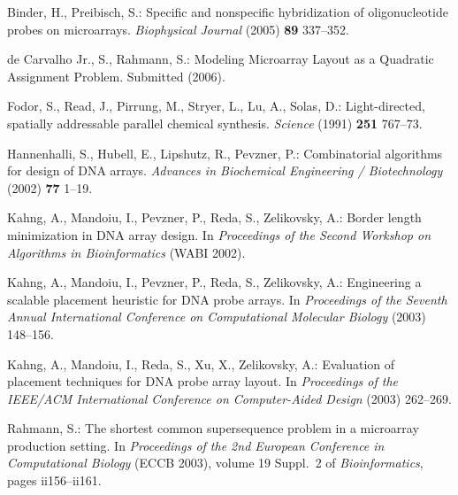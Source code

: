 \documentclass[runningheads]{llncs}
\newcommand{\ignore}[1]{}
\begin{document}
\begin{thebibliography}{5}

Binder, H., Preibisch, S.:
Specific and nonspecific hybridization of oligonucleotide probes on microarrays.
{\it Biophysical Journal} (2005) {\bf 89} 337--352.

de Carvalho Jr., S., Rahmann, S.:
Modeling Microarray Layout as a Quadratic Assignment Problem.
Submitted (2006).

\ignore{
\bibitem{CHASE76}
Chase, P.:
Subsequence numbers and logarithmic concavity.
{\it Discrete Mathematics} (1976) {\bf 16} 123--140.

\bibitem{FELDMAN93}
Feldman, W., Pevzner, P.:
Gray code masks for sequencing by hibridization.
{\it Genomics} (1994) {\bf 23} 233--235.
}

Fodor, S., Read, J., Pirrung, M., Stryer, L., Lu, A., Solas, D.:
Light-directed, spatially addressable parallel chemical synthesis.
{\it Science} (1991) {\bf 251} 767--73.

Hannenhalli, S., Hubell, E., Lipshutz, R., Pevzner, P.:
Combinatorial algorithms for design of DNA arrays.
{\it Advances in Biochemical Engineering / Biotechnology} (2002) {\bf 77} 1--19.

Kahng, A., Mandoiu, I., Pevzner, P., Reda, S., Zelikovsky, A.:
Border length minimization in DNA array design.
In {\it Proceedings of the Second Workshop on Algorithms in Bioinformatics} (WABI 2002).

Kahng, A., Mandoiu, I., Pevzner, P., Reda, S., Zelikovsky, A.:
Engineering a scalable placement heuristic for DNA probe arrays.
In {\it Proceedings of the Seventh Annual International Conference on Computational
Molecular Biology} (2003) 148--156.

Kahng, A., Mandoiu, I., Reda, S., Xu, X., Zelikovsky, A.:
Evaluation of placement techniques for DNA probe array layout.
In {\it Proceedings of the IEEE/ACM International Conference on Computer-Aided Design}
(2003) 262--269.

Rahmann, S.:
The shortest common supersequence problem in a microarray production setting.
In {\it Proceedings of the 2nd European Conference in Computational Biology}
({ECCB} 2003), volume 19 Suppl.~2 of {\it Bioinformatics}, pages ii156--ii161.

\end{thebibliography}
\end{document}
